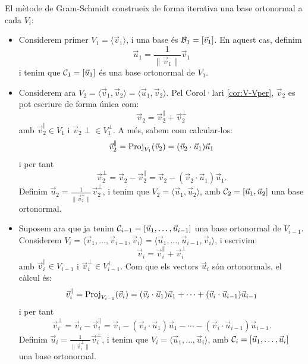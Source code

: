 \documentclass[
  11pt,
]{book}
\numberwithin{dummy}{section}
\theoremstyle{maincolornumbox}
\theoremstyle{blacknumex}
\theoremstyle{blacknumbox}
\theoremstyle{maincolornum}
\begin{document}
El mètode de Gram-Schmidt construeix de forma iterativa una base
ortonormal a cada \(V_i\):

\begin{itemize}
\item
  Considerem primer \(V_1=\langle \vec v_1 \rangle\), i una base és
  \(\mathcal{B}_1=[\vec v_1]\). En aquest cas, definim
  \[\vec u_1=\frac{1}{\|\vec v_1\|} \vec v_1\] i tenim que
  \(\mathcal{C}_1=[\vec u_1]\) és una base ortonormal de \(V_1\).
\item
  Considerem ara
  \(V_2=\langle \vec v_1, \vec v_2 \rangle=\langle \vec u_1, \vec v_2 \rangle\).
  Pel Corol·lari \ref{cor:V-Vper}, \(\vec v_2\) es pot escriure de forma única
  com: \[\vec v_2 = \vec v_2^\parallel + \vec v_2^\perp\] amb
  \(\vec v_2^\parallel\in V_1\) i \(\vec v_2\perp \in V_1^\perp\). A més,
  sabem com calcular-los:
  \[\vec v_2^\parallel = \operatorname{Proj}_{V_1}(\vec v_2)=(\vec v_2 \cdot \vec u_1)\vec u_1\]
  i per tant
  \[\vec v_2^\perp = \vec v_2 - \vec v_2^\parallel = \vec v_2 - (\vec v_2 \cdot \vec u_1)\vec u_1.\]
  Definim \(\vec u_2=\frac{1}{\|\vec v_2^\perp\|}\vec v_2^\perp\), i
  tenim que \(V_2=\langle \vec u_1, \vec u_2\rangle\), amb
  \(\mathcal{C}_2=[\vec u_1,\vec u_2]\) una base ortonormal.
\item
  Suposem ara que ja tenim
  \(\mathcal{C}_{i-1}=[\vec u_1, \dots, \vec u_{i-1}]\) una base ortonormal de
  \(V_{i-1}\). Considerem
  \(V_i=\langle\vec v_1, \dots, \vec v_{i-1},\vec v_i\rangle=\langle\vec u_1, \dots, \vec u_{i-1},\vec v_i\rangle\),
  i escrivim: \[\vec v_i = \vec v_i^\parallel + \vec v_i^\perp\] amb
  \(\vec v_i^\parallel\in V_{i-1}\) i
  \(\vec v_i^\perp \in V_{i-1}^\perp\). Com que els vectors \(\vec u_i\)
  són ortonormals, el càlcul és:
  \[\vec v_i^\parallel = \operatorname{Proj}_{V_{i-1}}(\vec v_i)=(\vec v_i \cdot \vec u_1)\vec u_1+ \cdots + (\vec v_i \cdot \vec u_{i-1})\vec u_{i-1}\]
  i per tant
  \[\vec v_i^\perp = \vec v_i - \vec v_i^\parallel = \vec v_i - (\vec v_i \cdot \vec u_1)\vec u_1- \cdots -(\vec v_i \cdot \vec u_{i-1})\vec u_{i-1}.\]
  Definim \(\vec u_i=\frac{1}{\|\vec v_i^\perp\|}\vec v_i^\perp\), i
  tenim que \(V_i=\langle \vec u_1, \dots ,\vec u_i\rangle\), amb
  \(\mathcal{C}_i=[\vec u_1,\dots,\vec u_i]\) una base ortonormal.
\end{itemize}
\end{document}
